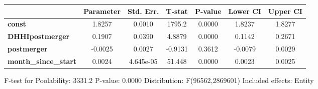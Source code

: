 \documentclass{report}
\begin{document}
\begin{center}
\begin{tabular}{lcccccc}
                             & \textbf{Parameter} & \textbf{Std. Err.} & \textbf{T-stat} & \textbf{P-value} & \textbf{Lower CI} & \textbf{Upper CI}  \\
\midrule
\textbf{const}               &       1.8257       &       0.0010       &      1795.2     &      0.0000      &       1.8237      &       1.8277       \\
\textbf{DHHIpostmerger}      &       0.1907       &       0.0390       &      4.8879     &      0.0000      &       0.1142      &       0.2671       \\
\textbf{postmerger}          &      -0.0025       &       0.0027       &     -0.9131     &      0.3612      &      -0.0079      &       0.0029       \\
\textbf{month\_since\_start} &       0.0024       &     4.645e-05      &      51.448     &      0.0000      &       0.0023      &       0.0025       \\
\bottomrule
\end{tabular}
\end{center}

F-test for Poolability: 3331.2 \newline
 P-value: 0.0000 \newline
 Distribution: F(96562,2869601) \newline
  \newline
 Included effects: Entity
\end{document}
